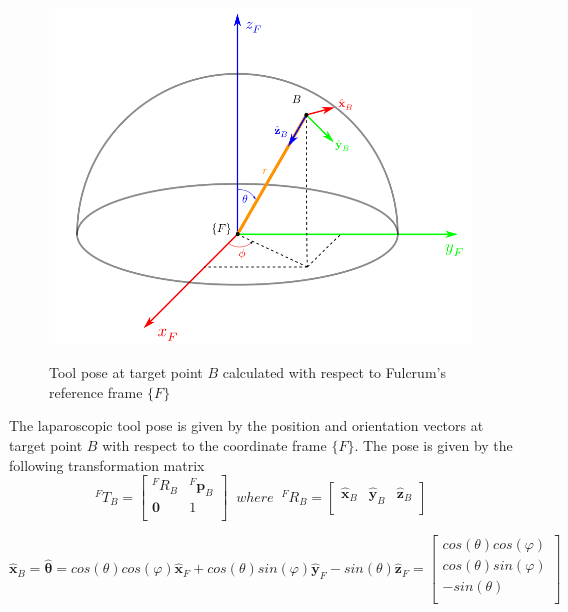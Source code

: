 \begin{center}
\begin{figure}[H]
\centering
\includegraphics[width=12cm]{images/fulcrum-space.png}\\
\caption{Tool pose at target point $B$ calculated with respect to Fulcrum's reference frame $\lbrace F \rbrace$}
\end{figure}
\end{center}

The laparoscopic tool pose is given by the position and orientation vectors at target point $B$ with respect to the coordinate frame $\lbrace F \rbrace$.
The pose is given by the following transformation matrix
\[
{}^{F}T_B = \begin{bmatrix}
{}^{F}R_B & {}^{F}\mathbf{p}^{}_B \\
\mathbf{0} & 1 \\
\end{bmatrix}
\;\; where \;\;
{}^{F}R_B = \begin{bmatrix}
\hat{\mathbf{x}}^{}_B & \hat{\mathbf{y}}^{}_B & \hat{\mathbf{z}}^{}_B \\
\end{bmatrix}
\]

\begin{equation}
\hat{\mathbf{x}}^{}_B = \hat{\mathbf{θ}} = cos(θ)cos(φ)\hat{\mathbf{x}}^{}_F + cos(θ)sin(φ)\hat{\mathbf{y}}^{}_F - sin(θ)\hat{\mathbf{z}}^{}_F
= \begin{bmatrix}
cos(θ)cos(φ) \\
cos(θ)sin(φ) \\
- sin(θ) \\
\end{bmatrix}
\end{equation}

